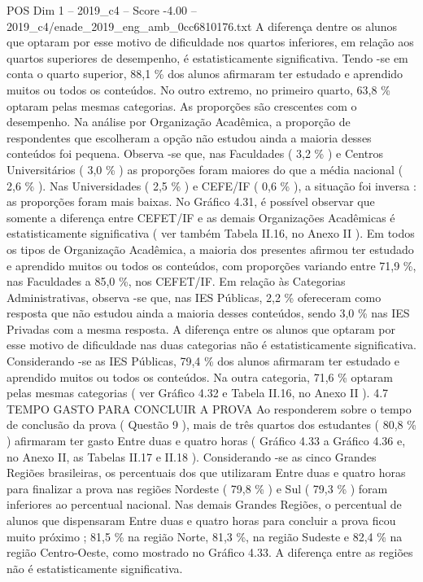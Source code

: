 \begin{textsample}{POS Dim 1 – 2019\_c4 – Score -4.00 – 2019\_c4/enade\_2019\_eng\_amb\_0cc6810176.txt}
A diferença dentre os alunos que optaram por esse motivo de dificuldade nos quartos inferiores, em relação aos quartos superiores de desempenho, é estatisticamente significativa.
Tendo -se em conta o quarto superior, 88,1 \% dos alunos afirmaram ter estudado e aprendido muitos ou todos os conteúdos.
No outro extremo, no primeiro quarto, 63,8 \% optaram pelas mesmas categorias.
As proporções são crescentes com o desempenho.
Na análise por Organização Acadêmica, a proporção de respondentes que escolheram a opção não estudou ainda a maioria desses conteúdos foi pequena.
Observa -se que, nas Faculdades ( 3,2 \% ) e Centros Universitários ( 3,0 \% ) as proporções foram maiores do que a média nacional ( 2,6 \% ).
Nas Universidades ( 2,5 \% ) e CEFE/IF ( 0,6 \% ), a situação foi inversa : as proporções foram mais baixas.
No Gráfico 4.31, é possível observar que somente a diferença entre CEFET/IF e as demais Organizações Acadêmicas é estatisticamente significativa ( ver também Tabela II.16, no Anexo II ).
Em todos os tipos de Organização Acadêmica, a maioria dos presentes afirmou ter estudado e aprendido muitos ou todos os conteúdos, com proporções variando entre 71,9 \%, nas Faculdades a 85,0 \%, nos CEFET/IF.
Em relação às Categorias Administrativas, observa -se que, nas IES Públicas, 2,2 \% ofereceram como resposta que não estudou ainda a maioria desses conteúdos, sendo 3,0 \% nas IES Privadas com a mesma resposta.
A diferença entre os alunos que optaram por esse motivo de dificuldade nas duas categorias não é estatisticamente significativa.
Considerando -se as IES Públicas, 79,4 \% dos alunos afirmaram ter estudado e aprendido muitos ou todos os conteúdos.
Na outra categoria, 71,6 \% optaram pelas mesmas categorias ( ver Gráfico 4.32 e Tabela II.16, no Anexo II ). 4.7 TEMPO GASTO PARA CONCLUIR A PROVA Ao responderem sobre o tempo de conclusão da prova ( Questão 9 ), mais de três quartos dos estudantes ( 80,8 \% ) afirmaram ter gasto Entre duas e quatro horas ( Gráfico 4.33 a Gráfico 4.36 e, no Anexo II, as Tabelas II.17 e II.18 ).
Considerando -se as cinco Grandes Regiões brasileiras, os percentuais dos que utilizaram Entre duas e quatro horas para finalizar a prova nas regiões Nordeste ( 79,8 \% ) e Sul ( 79,3 \% ) foram inferiores ao percentual nacional.
Nas demais Grandes Regiões, o percentual de alunos que dispensaram Entre duas e quatro horas para concluir a prova ficou muito próximo ; 81,5 \% na região Norte, 81,3 \%, na região Sudeste e 82,4 \% na região Centro-Oeste, como mostrado no Gráfico 4.33.
A diferença entre as regiões não é estatisticamente significativa.

\end{textsample}
